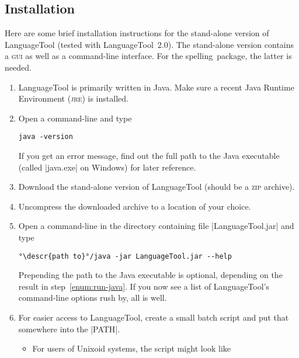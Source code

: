 \documentclass[11pt]{article}
\newcommand*{\pkg}{\textsf{spelling}}
\newcommand*{\acr}[1]{\mbox{\scshape#1}}
\newcommand*{\descr}[1]{〈\emph{#1}〉}
\begin{document}
\subsection{Installation}
\label{sec:lt-installation}

Here are some brief installation instructions for the stand-alone
version of LanguageTool (tested with LanguageTool~2.0).  The stand-alone
version contains a \acr{gui} as well as a command-line interface.  For
the \pkg\ package, the latter is needed.

\begin{enumerate}

\item LanguageTool is primarily written in Java.  Make sure a recent
  Java Runtime Environment (\acr{jre}) is installed.

\item\label{enum:run-java} Open a command-line and type

\begin{lstlisting}
java -version
\end{lstlisting}
%
  If you get an error message, find out the full path to the Java
  executable (called |java.exe| on Windows) for later reference.

\item Download the stand-alone version of LanguageTool (should be a
  \acr{zip} archive).

\item Uncompress the downloaded archive to a location of your choice.

\item Open a command-line in the directory containing file
  |LanguageTool.jar| and type

\begin{lstlisting}[escapeinside=°°]
°\descr{path to}°/java -jar LanguageTool.jar --help
\end{lstlisting}
%
  Prepending the path to the Java executable is optional, depending on
  the result in step~\ref{enum:run-java}.  If you now see a list of
  LanguageTool's command-line options rush by, all is well.

\item For easier access to LanguageTool, create a small batch script and
  put that somewhere into the |PATH|.

  \begin{itemize}

  \item For users of Unixoid systems, the script might look like


\end{itemize}
\end{enumerate}
\end{document}
